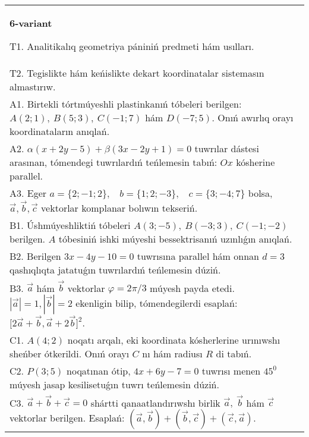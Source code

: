 \documentclass{article}
\begin{document}
\begin{tabular}{m{17cm}}
\textbf{6-variant}
\newline

T1. Analitikalıq geometriya pániniń predmeti hám usılları. 
 \\
T2. Tegislikte hám keńislikte dekart koordinatalar sistemasın almastırıw. 
 \\
A1. 
Birtekli tórtmúyeshli plastinkanıń tóbeleri berilgen:
$A(2;1), \ B(5;3), \ C(-1;7)$ hám $D(-7;5)$. Onıń awırlıq orayı
koordinataların anıqlań.
 \\
A2. 
$\alpha(x+2y-5)+\beta(3x-2y+1)=0$ tuwrılar
dástesi arasınan, tómendegi tuwrılardıń teńlemesin tabıń:
$Ox$ kósherine parallel.
 \\
A3. 
Eger \(a = \{ 2; - 1;2\},\ \ \ \ b = \{ 1;2; - 3\},\ \ \ \ c = \{ 3; - 4;7\}\) bolsa, $\overrightarrow{a}, \overrightarrow{b}, \overrightarrow{c}$ vektorlar komplanar bolıwın tekseriń. \\
B1. 
Úshmúyeshliktiń tóbeleri
\(A(3;-5),\ B(-3;3),\ C(-1;-2)\) berilgen. $A$ tóbesiniń ishki
múyeshi bessektrisanıń uzınlıǵın anıqlań.
 \\
B2. 
Berilgen \(3x-4y-10=0\) tuwrısına parallel hám onnan
$d=3$ qashıqlıqta jatatuǵın tuwrılardıń teńlemesin dúziń.
 \\
B3. 
$\vec{a}$ hám $\vec{b}$ vektorlar $\varphi = 2\pi/3$ múyesh payda etedi. $|\vec{a}| = 1,|\vec{b}| = 2$ ekenligin bilip, tómendegilerdi esaplań: 
$\lbrack 2\overrightarrow{a} + \overrightarrow{b},\overrightarrow{a} + 2\overrightarrow{b}\rbrack^{2}$.
 \\
C1. \(A(4;2)\) noqatı arqalı, eki koordinata kósherlerine
urınıwshı sheńber ótkerildi. Onıń orayı $C$ nı hám radiusı
$R$ di tabıń.
 \\
C2. 
\(P(3;5)\) noqatınan ótip, \(4x + 6y - 7 = 0\) tuwrısı
menen \(45^{0}\) múyesh jasap kesilisetuǵın tuwrı teńlemesin dúziń.
 \\
C3. \(\vec{a} + \vec{b} + \vec{c} = 0\) shártti qanaatlandırıwshı birlik \(\vec{a},\ \vec{b}\) hám \(\vec{c}\) vektorlar berilgen. Esaplań: \(\left(\vec{a},\vec{b} \right) + \left(\vec{b},\vec{c} \right) + \left(\vec{c},\vec{a} \right) \).
 \\

\end{tabular}
\vspace{1cm}
\end{document}
